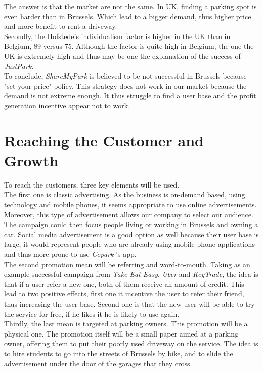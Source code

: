 \documentclass[12pt,a4paper,oneside]{book}
\newcommand{\bp}{\textit{Copark }}
\begin{document}
The answer is that the market are not the same. In UK, finding a parking spot is even harder than in Brussels.\cite{londonpark} Which lead to a bigger demand, thus higher price and more benefit to rent a driveway.\\
Secondly, the Hofstede's individualism factor is higher in the UK than in Belgium, 89 versus 75.\cite{hukbe} Although the factor is quite high in Belgium, the one the UK is extremely high and thus may be one the explanation of the success of \textit{JustPark}.\\

To conclude, \textit{ShareMyPark} is believed to be not successful in Brussels because "set your price" policy. This strategy does not work in our market because the demand is not extreme enough. It thus struggle to find a user base and the profit generation incentive appear not to work.

\section{Reaching the Customer and Growth}
To reach the customers, three key elements will be used.\\

The first one is classic advertising. As the business is on-demand based, using technology and mobile phones, it seems appropriate to use online advertisements. Moreover, this type of advertisement allows our company to select our audience. The campaign could then focus people living or working in Brussels and owning a car. Social media advertisement is a good option as well because their user base is large, it would represent people who are already using mobile phone applications and thus more prone to use \bp's app.\\

The second promotion mean will be referring and word-to-mouth. Taking as an example successful campaign from \textit{Take Eat Easy}, \textit{Uber} and \textit{KeyTrade}, the idea is that if a user refer a new one, both of them receive an amount of credit. This lead to two positive effects, first one it incentive the user to refer their friend, thus increasing the user base. Second one is that the new user will be able to try the service for free, if he likes it he is likely to use again.\\

Thirdly, the last mean is targeted at parking owners. This promotion will be a physical one. The promotion itself will be a small paper aimed at a parking owner, offering them to put their poorly used driveway on the service. The idea is to hire students to go into the streets of Brussels by bike, and to slide the advertisement under the door of the garages that they cross.\\
\end{document}

